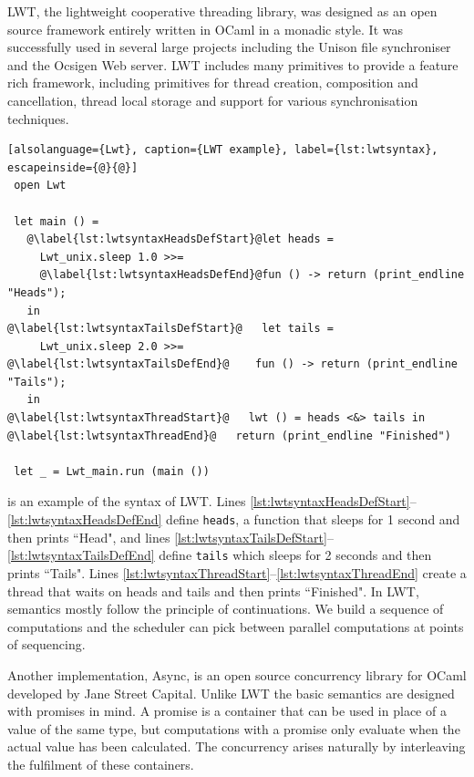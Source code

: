 \documentclass[12pt,twoside,notitlepage]{report}
\theoremstyle{plain}%
\theoremstyle{definition}
\theoremstyle{remark}
\begin{document}
LWT, the lightweight cooperative threading library\cite{vouillon2008lwt}, was designed as an open source framework entirely written in OCaml in a monadic style. It was successfully used in several large projects including the Unison file synchroniser and the Ocsigen Web server. LWT includes many primitives to provide a feature rich framework, including primitives for thread creation, composition and cancellation, thread local storage and support for various synchronisation techniques. 


\begin{minipage}{\linewidth}

\begin{lstlisting}[alsolanguage={Lwt}, caption={LWT example}, label={lst:lwtsyntax}, escapeinside={@}{@}]
 open Lwt
 
 let main () =
   @\label{lst:lwtsyntaxHeadsDefStart}@let heads =
     Lwt_unix.sleep 1.0 >>=
     @\label{lst:lwtsyntaxHeadsDefEnd}@fun () -> return (print_endline "Heads");
   in
@\label{lst:lwtsyntaxTailsDefStart}@   let tails =
     Lwt_unix.sleep 2.0 >>=
@\label{lst:lwtsyntaxTailsDefEnd}@    fun () -> return (print_endline "Tails");
   in
@\label{lst:lwtsyntaxThreadStart}@   lwt () = heads <&> tails in
@\label{lst:lwtsyntaxThreadEnd}@   return (print_endline "Finished")
 
 let _ = Lwt_main.run (main ())
\end{lstlisting}

\end{minipage}



 is an example of the syntax of LWT. Lines \ref{lst:lwtsyntaxHeadsDefStart}--\ref{lst:lwtsyntaxHeadsDefEnd} define \verb|heads|, a function that sleeps for 1 second and then prints ``Head", and lines \ref{lst:lwtsyntaxTailsDefStart}--\ref{lst:lwtsyntaxTailsDefEnd} define \verb|tails| which sleeps for 2 seconds and then prints ``Tails".  Lines \ref{lst:lwtsyntaxThreadStart}--\ref{lst:lwtsyntaxThreadEnd} create a thread that waits on heads and tails and then prints ``Finished".  In LWT, semantics mostly follow the principle of continuations. We build a sequence of computations and the scheduler can pick between parallel computations at points of sequencing.

Another implementation, Async, is an open source concurrency library for OCaml developed by Jane Street Capital. Unlike LWT the basic semantics are designed with promises in mind. A promise is a container that can be used in place of a value of the same type, but computations with a promise only evaluate when the actual value has been calculated. The concurrency arises naturally by interleaving the fulfilment of these containers. 
\end{document}
